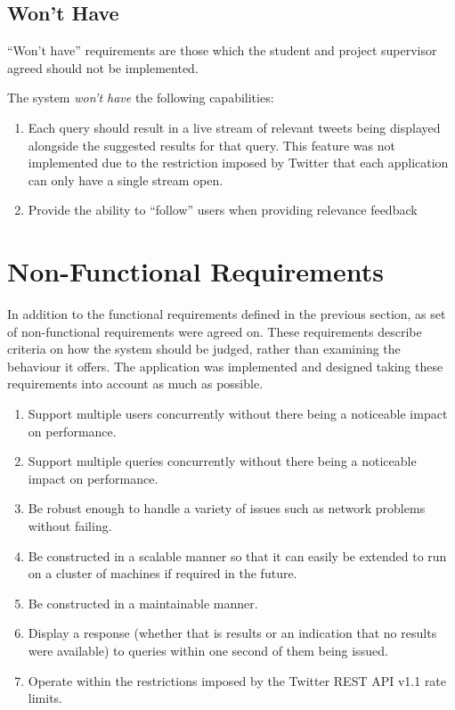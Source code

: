 \documentclass{l4proj}
\begin{document}
        \subsection{Won't Have}
        ``Won't have'' requirements are those which the student and project supervisor agreed should not be implemented.
        
        The system \textit{won't have} the following capabilities:
        \begin{enumerate}
        \item Each query should result in a live stream of relevant tweets being displayed alongside the suggested results for that query. This feature was not implemented due to the restriction imposed by Twitter that each application can only have a single stream open.
        \item Provide the ability to ``follow'' users when providing relevance feedback
        \end{enumerate}



    \section{Non-Functional Requirements}
    
    In addition to the functional requirements defined in the previous section, as set of non-functional requirements were agreed on. These requirements describe criteria on how the system should be judged, rather than examining the behaviour it offers. The application was implemented and designed taking these requirements into account as much as possible.
    
    \begin{enumerate}
    \item Support multiple users concurrently without there being a noticeable impact on performance.
    \item Support multiple queries concurrently without there being a noticeable impact on performance.
    \item Be robust enough to handle a variety of issues such as network problems without failing.
    \item Be constructed in a scalable manner so that it can easily be extended to run on a cluster of machines if required in the future.
    \item Be constructed in a maintainable manner.
    \item Display a response (whether that is results or an indication that no results were available) to queries within one second of them being issued.
    \item Operate within the restrictions imposed by the Twitter REST API v1.1 rate limits.

    \end{enumerate}
\end{document}
